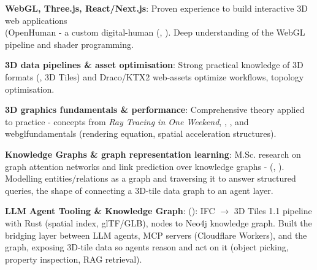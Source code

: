 \begin{onecolentry}
	\begin{highlightsforbulletentries}

		\item \textbf{WebGL, Three.js, React/Next.js}: Proven experience to build interactive 3D web applications \\ (OpenHuman - a custom digital-human  (, ). Deep understanding of the WebGL pipeline and shader programming.

		\item \textbf{3D data pipelines \& asset optimisation}: Strong practical knowledge of 3D formats (, 3D Tiles) and Draco/KTX2 web-assets optimize workflows, topology optimisation.

		\item \textbf{3D graphics fundamentals \& performance}: Comprehensive theory applied to practice - concepts from \textit{Ray Tracing in One Weekend}, , , and webglfundamentals (rendering equation, spatial acceleration structures).

		\item \textbf{Knowledge Graphs \& graph representation learning}: M.Sc. research on graph attention networks and link prediction over knowledge graphs -  (, ). Modelling entities/relations as a graph and traversing it to answer structured queries, the shape of connecting a 3D-tile data graph to an agent layer.

		\item \textbf{LLM Agent Tooling \& Knowledge Graph}:  (): IFC $\rightarrow$ 3D Tiles 1.1 pipeline with Rust (spatial index, glTF/GLB), nodes to Neo4j knowledge graph. Built the bridging layer between LLM agents, MCP servers (Cloudflare Workers), and the graph, exposing 3D-tile data so agents reason and act on it (object picking, property inspection, RAG retrieval).

	\end{highlightsforbulletentries}
\end{onecolentry}
